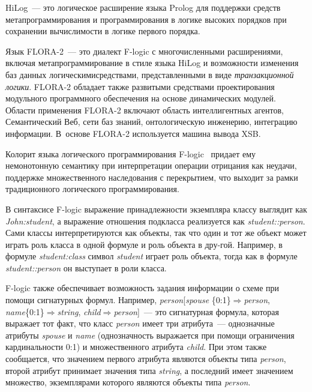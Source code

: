 \begin{multicols}{2}
HiLog~--- это логическое расширение языка Prolog для поддержки средств 
метапрограммирования и программирования в логике высоких порядков при сохранении 
вычислимости в логике первого порядка.

Язык FLORA-2~--- это диалект F-logic с многочисленными расширениями, включая 
метапрограммирование в стиле языка HiLog и возможности изменения баз данных 
логическими\linebreak средствами, представленными в виде \textit{транзакционной логики}. FLORA-2 
обладает также развитыми средствами проектирования модульного программного 
обеспечения на основе динамических модулей. Области применения FLORA-2 включают 
область интеллигентных агентов, Семантический Веб, сети баз знаний, онтологическую 
инженерию, интеграцию информации. В~основе FLORA-2 используется машина вывода XSB.

Колорит языка логического программирования F-logic~\cite{34kal} придает ему 
немонотонную семантику при интерпретации операции отрицания как неудачи, поддержке 
множественного наследования с перекрытием, что выходит за рамки традиционного 
логического программирования.

В синтаксисе F-logic выражение при\-над\-леж\-ности экземпляра классу выглядит как 
\textit{John:student}, а выражение отношения подкласса реализуется как 
\textit{student::person}. Сами классы интерпретируются как объекты, так что один и тот же 
объект может играть роль класса в одной формуле и роль объекта в дру-\linebreak гой. Например, в 
формуле \textit{student:class} символ\linebreak
\textit{student} играет роль объекта, тогда как в 
формуле \textit{student::person} он выступает в роли класса.

F-logic также обеспечивает возможность задания информации о схеме при помощи 
сигнатурных формул. Например, \textit{person}[\textit{spouse} 
\{0:1\}\;$\Rightarrow$\;\textit{person}, \textit{name}\{0:1\}\;$\Rightarrow$\;\textit{string}, 
\textit{child}\;$\Rightarrow$\;\textit{person}]~--- это сигнатурная формула, которая выражает 
тот факт, что класс \textit{person} имеет три атрибута~--- однозначные атрибуты 
\textit{spouse} и \textit{name} (однозначность выражается при помощи ограничения 
кардинальности 0:1) и множественного атрибута \textit{child}. При этом также сообщается, 
что значением первого атрибута являются объекты типа \textit{person}, второй атрибут 
принимает значения типа \textit{string}, а последний имеет значением множество, 
экземплярами которого являются объекты типа \textit{person}.


\end{multicols}
